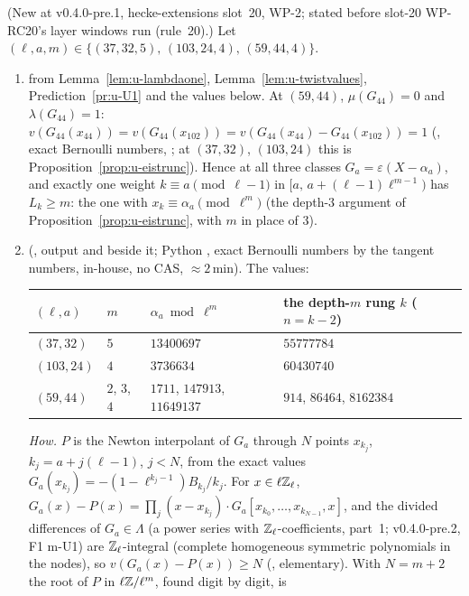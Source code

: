 \documentclass[11pt]{article}
\newcommand{\Iw}{\Lambda}                         %
\newcommand{\Zl}{\Z_\ell}
\begin{document}
\begin{prediction}\label{pr:u-rungs}
(New at v0.4.0-pre.1, hecke-extensions slot~20, WP-2; stated before slot-20 WP-RC20's layer windows run (rule~20).) Let $(\ell,a,m)\in\{(37,32,5),\,(103,24,4),\,(59,44,4)\}$.
\begin{enumerate}
\item \PROVED{} from Lemma~\ref{lem:u-lambdaone}, Lemma~\ref{lem:u-twistvalues}, Prediction~\ref{pr:u-U1} and the \COMP{} values below. At $(59,44)$, $\mu(G_{44})=0$ and $\lambda(G_{44})=1$:
  $v(G_{44}(x_{44}))=v(G_{44}(x_{102}))=v(G_{44}(x_{44})-G_{44}(x_{102}))=1$ (\COMP, exact Bernoulli numbers, ; at $(37,32)$, $(103,24)$ this
  is Proposition~\ref{prop:u-eistrunc}). Hence at all three classes $G_a=\varepsilon(X-\alpha_a)$, and exactly one weight $k\equiv a\pmod{\ell-1}$ in $[a,\,a+(\ell-1)\ell^{m-1})$ has $L_k\ge m$:
  the one with $x_k\equiv\alpha_a\pmod{\ell^{m}}$ (the depth-$3$ argument of Proposition~\ref{prop:u-eistrunc}, with $m$ in place of $3$).
\item \COMP{} (, output  and  beside it; Python , exact Bernoulli
  numbers by the tangent numbers, in-house, no CAS, $\approx2$\,min). The values:
  \begin{center}\small
  \begin{tabular}{@{}llll@{}}
  \toprule
  $(\ell,a)$ & $m$ & $\alpha_a\bmod\ell^{m}$ & the depth-$m$ rung $k$ ($n=k-2$)\\
  \midrule
  $(37,32)$ & $5$ & $13400697$ & $55777784$\\
  $(103,24)$ & $4$ & $3736634$ & $60430740$\\
  $(59,44)$ & $2$, $3$, $4$ & $1711$, $147913$, $11649137$ & $914$, $86464$, $8162384$\\
  \bottomrule
  \end{tabular}
  \end{center}
  \emph{How.} $P$ is the Newton interpolant of $G_a$ through $N$ points $x_{k_j}$, $k_j=a+j(\ell-1)$, $j<N$, from the exact values $G_a(x_{k_j})=-(1-\ell^{k_j-1})B_{k_j}/k_j$. For $x\in\ell\mathbb{Z}_\ell$,
  $G_a(x)-P(x)=\prod_j(x-x_{k_j})\cdot G_a[x_{k_0},\dots,x_{k_{N-1}},x]$, and the divided differences of $G_a\in\Iw$ (a power series with $\Zl$-coefficients, part~1; v0.4.0-pre.2, F1 m-U1) are $\Zl$-integral (complete
  homogeneous symmetric polynomials in the nodes), so $v(G_a(x)-P(x))\ge N$ (\PROVED, elementary). With $N=m+2$ the root of $P$ in $\ell\mathbb{Z}/\ell^{m}$, found digit by digit, is

\end{enumerate}
\end{prediction}
\end{document}
